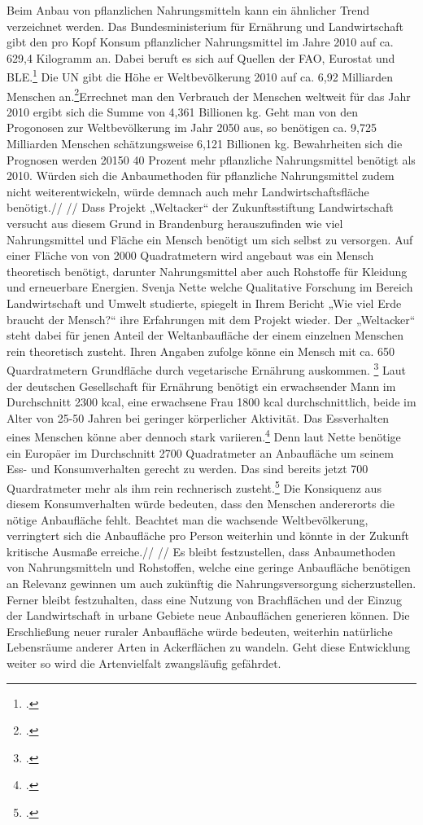 \documentclass{scrartcl}
\begin{document}
Beim Anbau von pflanzlichen Nahrungsmitteln kann ein ähnlicher Trend verzeichnet werden. Das Bundesministerium für Ernährung und Landwirtschaft gibt den pro Kopf Konsum pflanzlicher Nahrungsmittel im Jahre 2010 auf ca. 629,4 Kilogramm an. Dabei beruft es sich auf Quellen der FAO, Eurostat und BLE.\footcite[Vgl.][S. 1]{bericht Bmel-statistik} Die UN gibt die Höhe er Weltbevölkerung 2010 auf ca. 6,92 Milliarden Menschen an.\footcite[Vgl.][S. 3]{World Population Prospects 2015}Errechnet man den Verbrauch der Menschen weltweit für das Jahr 2010 ergibt sich die Summe von 4,361 Billionen kg. Geht man von den Progonosen zur Weltbevölkerung im Jahr 2050 aus, so benötigen ca. 9,725 Milliarden Menschen schätzungsweise 6,121 Billionen kg. Bewahrheiten sich die Prognosen werden 20150 40 Prozent mehr pflanzliche Nahrungsmittel benötigt als 2010. Würden sich die Anbaumethoden für pflanzliche Nahrungsmittel zudem nicht weiterentwickeln, würde demnach auch mehr Landwirtschaftsfläche benötigt.//
//
Dass Projekt „Weltacker“ der Zukunftsstiftung Landwirtschaft versucht aus diesem Grund in Brandenburg herauszufinden wie viel Nahrungsmittel und Fläche ein Mensch benötigt um sich selbst zu versorgen. Auf einer Fläche von von 2000 Quadratmetern wird angebaut was ein Mensch theoretisch benötigt, darunter Nahrungsmittel aber auch Rohstoffe für Kleidung und erneuerbare Energien. Svenja Nette welche Qualitative Forschung im Bereich Landwirtschaft und Umwelt studierte, spiegelt in Ihrem Bericht „Wie viel Erde braucht der Mensch?“ ihre Erfahrungen mit dem Projekt wieder. Der „Weltacker“ steht dabei für jenen Anteil der Weltanbaufläche der einem einzelnen Menschen rein theoretisch zusteht. Ihren Angaben zufolge könne ein Mensch mit ca. 650 Quardratmetern Grundfläche durch vegetarische Ernährung auskommen. \footcite[Vgl.]{Wieviel Erde braucht der Mensch?} Laut der deutschen Gesellschaft für Ernährung benötigt ein erwachsender Mann im Durchschnitt 2300 kcal, eine erwachsene Frau 1800 kcal durchschnittlich, beide im Alter von 25-50 Jahren bei geringer körperlicher Aktivität. Das Essverhalten eines Menschen könne aber dennoch stark variieren.\footcite[Vgl.]{Wie viel Energie braucht der Mensch?} Denn laut Nette benötige ein Europäer im Durchschnitt 2700 Quadratmeter an Anbaufläche um seinem Ess- und Konsumverhalten gerecht zu werden. Das sind bereits jetzt 700 Quardratmeter mehr als ihm rein rechnerisch zusteht.\footcite[Vgl.]{Wieviel Erde braucht der Mensch?} Die Konsiquenz aus diesem Konsumverhalten würde bedeuten, dass den Menschen andererorts die nötige Anbaufläche fehlt. Beachtet man die wachsende Weltbevölkerung, verringtert sich die Anbaufläche pro Person weiterhin und könnte in der Zukunft kritische Ausmaße erreiche.//
//
Es bleibt festzustellen, dass Anbaumethoden von Nahrungsmitteln und Rohstoffen, welche eine geringe Anbaufläche benötigen an Relevanz gewinnen um auch zukünftig die Nahrungsversorgung sicherzustellen. Ferner bleibt festzuhalten, dass eine Nutzung von Brachflächen und der Einzug der Landwirtschaft in urbane Gebiete neue Anbauflächen generieren können. Die Erschließung neuer ruraler Anbaufläche würde bedeuten, weiterhin natürliche Lebensräume anderer Arten in Ackerflächen zu wandeln. Geht diese Entwicklung weiter so wird die Artenvielfalt zwangsläufig gefährdet.
\end{document}
